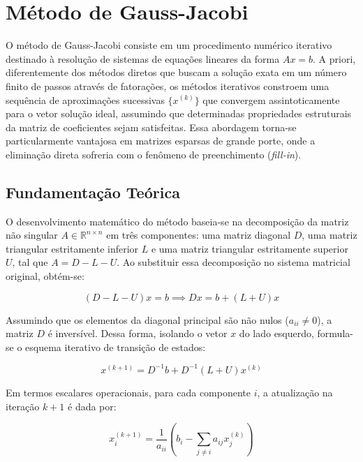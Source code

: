 \section{Método de Gauss-Jacobi}

O método de Gauss-Jacobi consiste em um procedimento numérico iterativo destinado à resolução de sistemas de equações lineares da forma $Ax = b$. A priori, diferentemente dos métodos diretos que buscam a solução exata em um número finito de passos através de fatorações, os métodos iterativos constroem uma sequência de aproximações sucessivas $\{x^{(k)}\}$ que convergem assintoticamente para o vetor solução ideal, assumindo que determinadas propriedades estruturais da matriz de coeficientes sejam satisfeitas. Essa abordagem torna-se particularmente vantajosa em matrizes esparsas de grande porte, onde a eliminação direta sofreria com o fenômeno de preenchimento (\textit{fill-in}).

\subsection{Fundamentação Teórica}

O desenvolvimento matemático do método baseia-se na decomposição da matriz não singular $A \in \mathbb{R}^{n \times n}$ em três componentes: uma matriz diagonal $D$, uma matriz triangular estritamente inferior $L$ e uma matriz triangular estritamente superior $U$, tal que $A = D - L - U$. Ao substituir essa decomposição no sistema matricial original, obtém-se:

\begin{equation}
    (D - L - U)x = b \implies Dx = b + (L + U)x
\end{equation}

Assumindo que os elementos da diagonal principal são não nulos ($a_{ii} \neq 0$), a matriz $D$ é inversível. Dessa forma, isolando o vetor $x$ do lado esquerdo, formula-se o esquema iterativo de transição de estados:

\begin{equation}
    x^{(k+1)} = D^{-1}b + D^{-1}(L + U)x^{(k)}
\end{equation}

Em termos escalares operacionais, para cada componente $i$, a atualização na iteração $k+1$ é dada por:

\begin{equation}
    x_i^{(k+1)} = \frac{1}{a_{ii}} \left( b_i - \sum_{j \neq i} a_{ij} x_j^{(k)} \right)
\end{equation}


